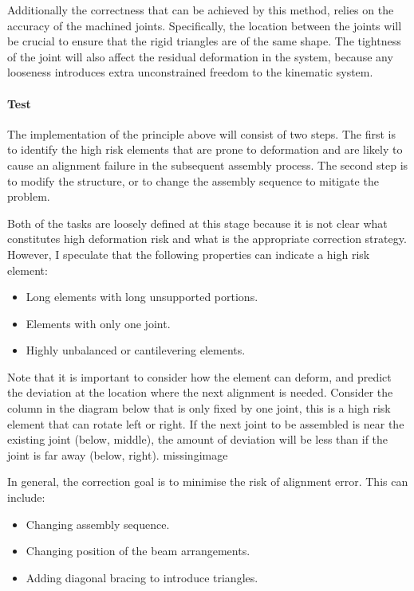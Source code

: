 Additionally the correctness that can be achieved by this method, relies on the accuracy of the machined joints. Specifically, the location between the joints will be crucial to ensure that the rigid triangles are of the same shape. The tightness of the joint will also affect the residual deformation in the system, because any looseness introduces extra unconstrained freedom to the kinematic system. 

\paragraph{Test}
The implementation of the principle above will consist of two steps. The first is to identify the high risk elements that are prone to deformation and are likely to cause an alignment failure in the subsequent assembly process. The second step is to modify the structure, or to change the assembly sequence to mitigate the problem.

Both of the tasks are loosely defined at this stage because it is not clear what constitutes high deformation risk and what is the appropriate correction strategy. However, I speculate that the following properties can indicate a high risk element:
\begin{itemize}
    \item Long elements with long unsupported portions.
    \item Elements with only one joint.
    \item Highly unbalanced or cantilevering elements.
\end{itemize}
Note that it is important to consider how the element can deform, and predict the deviation at the location where the next alignment is needed. Consider the column in the diagram below that is only fixed by one joint, this is a high risk element that can rotate left or right. If the next joint to be assembled is near the existing joint (below, middle), the amount of deviation will be less than if the joint is far away (below, right). 
missingimage

In general, the correction goal is to minimise the risk of alignment error. This can include:
\begin{itemize}
    \item Changing assembly sequence.
    \item Changing position of the beam arrangements.
    \item Adding diagonal bracing to introduce triangles.
\end{itemize}

